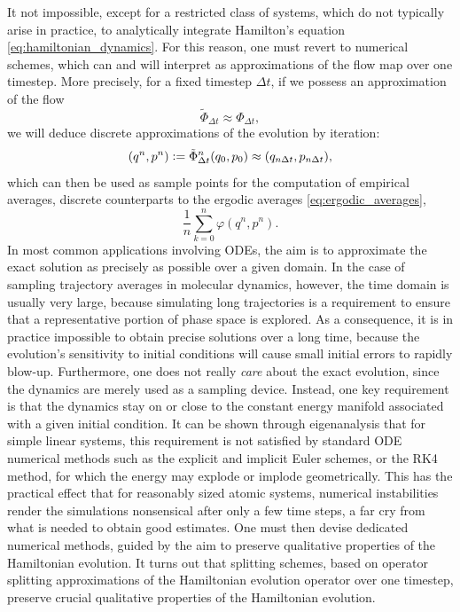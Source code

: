     It not impossible, except for a restricted class of systems, which do not typically arise in practice, to analytically integrate Hamilton's equation \eqref{eq:hamiltonian_dynamics}. For this reason, one must revert to numerical schemes, which can and will interpret as approximations of the flow map over one timestep.
    More precisely, for a fixed timestep $\Delta t$, if we possess an approximation of the flow 
    \[\tilde\Phi_{\Delta t}\approx\Phi_{\Delta t},\]
    we will deduce discrete approximations of the evolution by iteration:
    \begin{equation}\label{eq:discrete_dynamics}(q^n,p^n)\mathrel{\mathop:}= \tilde\Phi_{\Delta t}^n(q_0,p_0)\approx (q_{n\Delta t},p_{n\Delta t}),\end{equation}
    which can then be used as sample points for the computation of empirical averages, discrete counterparts to the ergodic averages \eqref{eq:ergodic_averages},
    \begin{equation}
        \label{eq:discrete_ergodic_averages}
        \frac 1n\sum_{k=0}^n \varphi(q^n,p^n).
    \end{equation}
    In most common applications involving ODEs, the aim is to approximate the exact solution as precisely as possible over a given domain.
    In the case of sampling trajectory averages in molecular dynamics, however, the time domain is usually very large, because simulating long trajectories is a requirement to ensure that a representative portion of phase space is explored. As a consequence, it is in practice impossible to obtain precise solutions over a long time, because the evolution's sensitivity to initial conditions will cause small initial errors to rapidly blow-up. 
    Furthermore, one does not really \textit{care} about the exact evolution, since the dynamics are merely used as a sampling device. Instead, one key requirement is that the dynamics stay on or close to the constant energy manifold associated with a given initial condition. It can be shown through eigenanalysis that for simple linear systems, this requirement is not satisfied by standard ODE numerical methods such as the explicit and implicit Euler schemes, or the RK4 method, for which the energy may explode or implode geometrically.
    This has the practical effect that for reasonably sized atomic systems, numerical instabilities render the simulations nonsensical after only a few time steps, a far cry from what is needed to obtain good estimates.
    One must then devise dedicated numerical methods, guided by the aim to preserve qualitative properties of the Hamiltonian evolution. It turns out that splitting schemes, based on operator splitting approximations of the Hamiltonian evolution operator over one timestep, preserve crucial qualitative properties of the Hamiltonian evolution.

